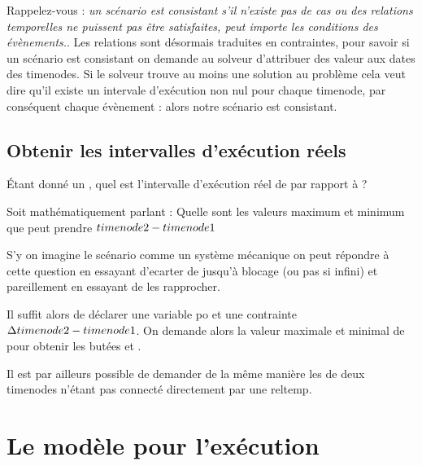 Rappelez-vous : \emph{un scénario est consistant s'il n'existe pas de cas ou des relations temporelles ne puissent pas être satisfaites, peut importe les conditions des évènements.}. Les relations sont désormais traduites en contraintes, pour savoir si un scénario est consistant on demande au solveur d'attribuer des valeur aux dates des timenodes. Si le solveur trouve au moins une solution au problème cela veut dire qu'il existe un intervale d'exécution non nul pour chaque timenode, par conséquent chaque évènement : alors notre scénario est consistant.

\subsection{Obtenir les intervalles d'exécution réels}
Étant donné un , quel est l'intervalle d'exécution réel de  par rapport à ?

Soit mathématiquement parlant : 
Quelle sont les valeurs maximum et minimum que peut prendre $\tnode{2} - \tnode{1}$

\begin{apparte}
S'y on imagine le scénario comme un système mécanique on peut répondre à cette question en essayant d'ecarter  de  jusqu'à blocage (ou pas si infini) et pareillement en essayant de les rapprocher.
\end{apparte}

Il suffit alors de déclarer une variable \intReel{} po et une contrainte $\intReel{} = \tnode{2} - \tnode{1}$. On demande alors la valeur maximale et minimal de \intReel{} pour obtenir les butées  et .

Il est par ailleurs possible de demander de la même manière les \intReel{} de deux \glspl{timenode} n'étant pas connecté directement par une \gls{reltemp}.

\section{Le modèle pour l'exécution}
